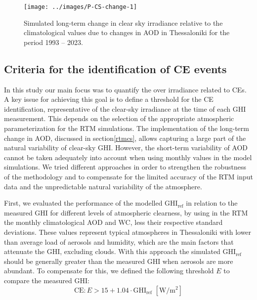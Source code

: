 \documentclass[preprint, 5p,
authoryear]{elsarticle} %
\begin{document}
\begin{figure}

{\centering \texttt{[image: ../images/P-CS-change-1]} 

}

\caption{Simulated long-term change in clear sky irradiance relative to the climatological values due to changes in AOD in Thessaloniki for the period 1993 -- 2023.}\label{fig:CS-change}
\end{figure}

\hypertarget{criteria-for-the-identification-of-ce-events}{%
\subsection{Criteria for the identification of CE
events}\label{criteria-for-the-identification-of-ce-events}}

In this study our main focus was to quantify the over irradiance related
to CEs. A key issue for achieving this goal is to define a threshold for
the CE identification, representative of the clear-sky irradiance at the
time of each GHI measurement. This depends on the selection of the
appropriate atmospheric parameterization for the RTM simulations. The
implementation of the long-term change in AOD, discussed in
section\nobreakspace{}\ref{rtmcs}, allows capturing a large part of the
natural variability of clear-sky GHI. However, the short-term
variability of AOD cannot be taken adequately into account when using
monthly values in the model simulations. We tried different approaches
in order to strengthen the robustness of the methodology and to
compensate for the limited accuracy of the RTM input data and the
unpredictable natural variability of the atmosphere.

First, we evaluated the performance of the modelled
\(\text{GHI}_\text{ref}\) in relation to the measured GHI for different
levels of atmospheric clearness, by using in the RTM the monthly
climatological AOD and WC, less their respective standard deviations.
These values represent typical atmospheres in Thessaloniki with lower
than average load of aerosols and humidity, which are the main factors
that attenuate the GHI, excluding clouds. With this approach the
simulated \(\text{GHI}_\text{ref}\) should be generally greater than the
measured GHI when aerosols are more abundant. To compensate for this, we
defined the following threshold \(E\) to compare the measured
\(\text{GHI}\): \begin{equation}
\text{CE} : E > 15 + 1.04 \cdot \text{GHI}_\text{ref} \,\,[\text{W}/\text{m}^2] \label{eq:CE4}
\end{equation}
\end{document}
